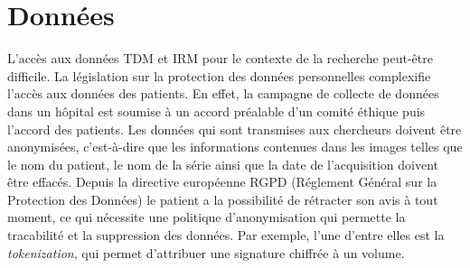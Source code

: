 \section{Données}
L'accès aux données TDM et IRM pour le contexte de la recherche  peut-être difficile. La législation sur la protection des données personnelles complexifie l'accès aux données des patients. En effet, la campagne de collecte de données dans un hôpital est soumise à un accord préalable d'un comité éthique puis l'accord des patients. Les données qui sont transmises aux chercheurs doivent être anonymisées, c'est-à-dire que les informations contenues dans les images telles que le nom du patient, le nom de la série ainsi que la date de l'acquisition doivent être effacés. Depuis la  directive européenne RGPD (Réglement Général sur la Protection des Données) le patient a la possibilité de rétracter son avis à tout moment, ce qui nécessite une politique d'anonymisation qui permette la tracabilité et la suppression des données. Par exemple, l'une d'entre elles est la \textit{tokenization}, qui permet d'attribuer une signature chiffrée à un volume.

